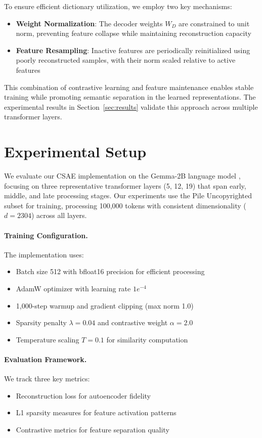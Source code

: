 \documentclass{article} %
\begin{document}
To ensure efficient dictionary utilization, we employ two key mechanisms:
\begin{itemize}
    \item \textbf{Weight Normalization}: The decoder weights $W_D$ are constrained to unit norm, preventing feature collapse while maintaining reconstruction capacity
    \item \textbf{Feature Resampling}: Inactive features are periodically reinitialized using poorly reconstructed samples, with their norm scaled relative to active features
\end{itemize}

This combination of contrastive learning and feature maintenance enables stable training while promoting semantic separation in the learned representations. The experimental results in Section~\ref{sec:results} validate this approach across multiple transformer layers.

\section{Experimental Setup}
\label{sec:experimental}

We evaluate our CSAE implementation on the Gemma-2B language model \cite{gpt4}, focusing on three representative transformer layers (5, 12, 19) that span early, middle, and late processing stages. Our experiments use the Pile Uncopyrighted subset for training, processing 100,000 tokens with consistent dimensionality ($d=2304$) across all layers.

\paragraph{Training Configuration.} The implementation uses:
\begin{itemize}
    \item Batch size 512 with bfloat16 precision for efficient processing
    \item AdamW optimizer \cite{loshchilov2017adamw} with learning rate $1e^{-4}$
    \item 1,000-step warmup and gradient clipping (max norm 1.0)
    \item Sparsity penalty $\lambda=0.04$ and contrastive weight $\alpha=2.0$
    \item Temperature scaling $T=0.1$ for similarity computation
\end{itemize}

\paragraph{Evaluation Framework.} We track three key metrics:
\begin{itemize}
    \item Reconstruction loss for autoencoder fidelity
    \item L1 sparsity measures for feature activation patterns
    \item Contrastive metrics for feature separation quality
\end{itemize}
\end{document}
